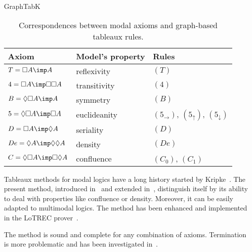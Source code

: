 \begin{entry}{GraphTabK}
\begin{clarifications}
  \begin{table}
  \center
  \begin{tabular}{l l l}
    Axiom & Model's property & Rules \\
    \hline
    $T = \Box A \imp A$ & reflexivity & $(T)$ \\
    $4 = \Box A \imp \Box\Box A$ & transitivity & $(4)$ \\
    $B = \Diamond\Box A \imp A$ & symmetry & $(B)$ \\
    $5 = \Diamond\Box A \imp \Box A$ & euclideanity &
      $(5_{\mathord\rightarrow})$, $(5_{\mathord\uparrow})$, $(5_{\mathord\downarrow})$ \\
    $D = \Box A \imp \Diamond A$ & seriality & $(D)$ \\
    $De = \Diamond A \imp \Diamond\Diamond A$ & density & $(De)$ \\
    $C = \Diamond\Box A \imp \Box\Diamond A$ & confluence & $(C_0)$, $(C_1)$
  \end{tabular}
  \caption{Correspondences between modal axioms and graph-based tableaux rules.}
  \label{tab:GraphTabK}
  \end{table}
\end{clarifications}

\begin{history}
  Tableaux methods for modal logics have a long history started by Kripke~\cite{kripke.1959}.
  The present method, introduced in~\cite{castilho-farinas-gasquet-herzig.1997} and extended in~\cite{farinas-gasquet.2002},
  distinguish itself by its ability to deal with properties like confluence or density.
  Moreover, it can be easily adapted to multimodal logics.
  The method has been enhanced and implemented in the LoTREC prover~\cite{gasquet-herzig-said-schwarzentruber.2014}.
\end{history}

\begin{technicalities}
  The method is sound and complete for any combination of axioms.
  Termination is more problematic
  and has been investigated in~\cite{farinas-gasquet.2002,gasquet-herzig-sahade.2006,gasquet-herzig-said-schwarzentruber.2014}.
\end{technicalities}


\end{entry}
